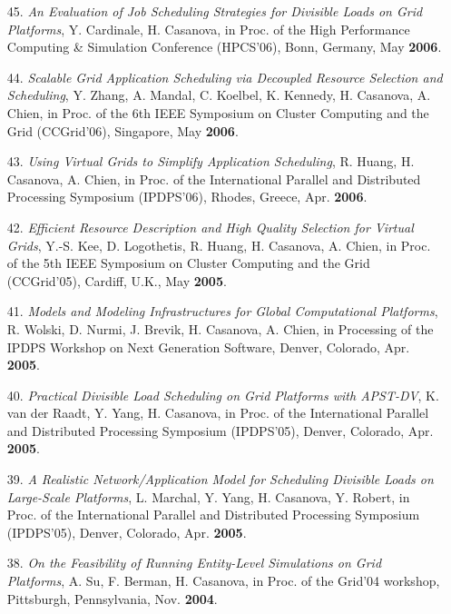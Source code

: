 \begin{enumerate}
\item[45.] {\it An Evaluation of Job Scheduling Strategies for Divisible
Loads on Grid Platforms}, Y. Cardinale, H. Casanova, in Proc. of the
High Performance Computing \& Simulation Conference (HPCS'06), Bonn,
Germany, May {\bf 2006}.

\item[44.] {\it Scalable Grid Application Scheduling via Decoupled Resource
Selection and Scheduling}, Y. Zhang, A. Mandal, C. Koelbel, K. Kennedy, H.
Casanova, A.  Chien, in Proc. of the 6th IEEE Symposium on Cluster
Computing and the Grid (CCGrid'06), Singapore, May {\bf 2006}.

\item[43.] {\it Using Virtual Grids to Simplify Application Scheduling},
R. Huang, H. Casanova, A. Chien, in Proc. of the
International Parallel and Distributed Processing Symposium (IPDPS'06),
Rhodes, Greece, Apr. {\bf 2006}.

\item[42.] {\it Efficient Resource Description and High Quality Selection
for Virtual Grids}, Y.-S. Kee, D. Logothetis, R. Huang, H. Casanova, A.
Chien, in Proc. of the 5th IEEE Symposium on Cluster
Computing and the Grid (CCGrid'05), Cardiff, U.K., May {\bf 2005}.

\item [41.]
{\it Models and Modeling Infrastructures for Global Computational Platforms},
R. Wolski, D. Nurmi, J. Brevik, H. Casanova, A. Chien,
in Processing of the IPDPS Workshop on Next Generation Software,
Denver, Colorado, Apr. {\bf 2005}.

\item [40.] 
{\it Practical Divisible Load Scheduling on Grid Platforms with
APST-DV}, K. van der Raadt, Y. Yang, H. Casanova, in Proc. of
the International Parallel and Distributed Processing Symposium
(IPDPS'05), Denver, Colorado, Apr. {\bf 2005}.

\item [39.] {\it A Realistic Network/Application Model for Scheduling
Divisible Loads on Large-Scale Platforms}, L. Marchal, Y. Yang, H.
Casanova, Y. Robert, in Proc. of
the International Parallel and Distributed Processing Symposium
(IPDPS'05), Denver, Colorado, Apr. {\bf 2005}.

\item [38.] 
{\it On the Feasibility of Running Entity-Level Simulations on
Grid Platforms}, A. Su, F. Berman, H. Casanova, in Proc. of the
Grid'04 workshop, Pittsburgh, Pennsylvania, Nov. {\bf 2004}.


\end{enumerate}
